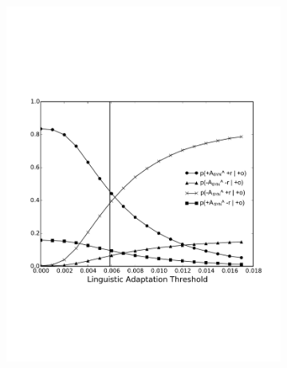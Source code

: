 \documentclass[man,biblatex,floatsintext]{apa6}
\begin{document}
\begin{figure}[!htb]
\begin{subfigure}{.5\textwidth} 
  \centering
  \includegraphics[width=\linewidth]{Figures/SynAposi_new_rob_New_Enlarge.pdf}
  \caption{\label{fig:ProbSynPoso}}
\end{subfigure}%
\begin{subfigure}{.5\textwidth}
  \centering

\end{subfigure}
\end{figure}
\end{document}
